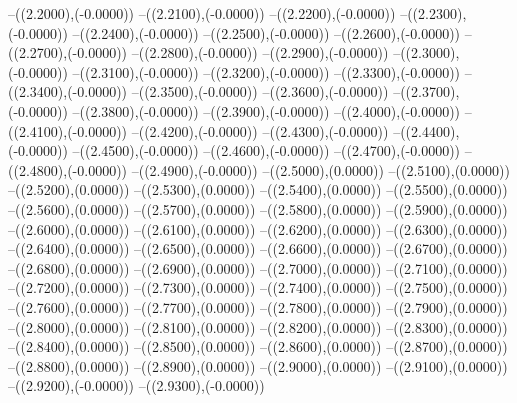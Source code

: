 {	--({\sx*(2.2000)},{\sy*(-0.0000)})
	--({\sx*(2.2100)},{\sy*(-0.0000)})
	--({\sx*(2.2200)},{\sy*(-0.0000)})
	--({\sx*(2.2300)},{\sy*(-0.0000)})
	--({\sx*(2.2400)},{\sy*(-0.0000)})
	--({\sx*(2.2500)},{\sy*(-0.0000)})
	--({\sx*(2.2600)},{\sy*(-0.0000)})
	--({\sx*(2.2700)},{\sy*(-0.0000)})
	--({\sx*(2.2800)},{\sy*(-0.0000)})
	--({\sx*(2.2900)},{\sy*(-0.0000)})
	--({\sx*(2.3000)},{\sy*(-0.0000)})
	--({\sx*(2.3100)},{\sy*(-0.0000)})
	--({\sx*(2.3200)},{\sy*(-0.0000)})
	--({\sx*(2.3300)},{\sy*(-0.0000)})
	--({\sx*(2.3400)},{\sy*(-0.0000)})
	--({\sx*(2.3500)},{\sy*(-0.0000)})
	--({\sx*(2.3600)},{\sy*(-0.0000)})
	--({\sx*(2.3700)},{\sy*(-0.0000)})
	--({\sx*(2.3800)},{\sy*(-0.0000)})
	--({\sx*(2.3900)},{\sy*(-0.0000)})
	--({\sx*(2.4000)},{\sy*(-0.0000)})
	--({\sx*(2.4100)},{\sy*(-0.0000)})
	--({\sx*(2.4200)},{\sy*(-0.0000)})
	--({\sx*(2.4300)},{\sy*(-0.0000)})
	--({\sx*(2.4400)},{\sy*(-0.0000)})
	--({\sx*(2.4500)},{\sy*(-0.0000)})
	--({\sx*(2.4600)},{\sy*(-0.0000)})
	--({\sx*(2.4700)},{\sy*(-0.0000)})
	--({\sx*(2.4800)},{\sy*(-0.0000)})
	--({\sx*(2.4900)},{\sy*(-0.0000)})
	--({\sx*(2.5000)},{\sy*(0.0000)})
	--({\sx*(2.5100)},{\sy*(0.0000)})
	--({\sx*(2.5200)},{\sy*(0.0000)})
	--({\sx*(2.5300)},{\sy*(0.0000)})
	--({\sx*(2.5400)},{\sy*(0.0000)})
	--({\sx*(2.5500)},{\sy*(0.0000)})
	--({\sx*(2.5600)},{\sy*(0.0000)})
	--({\sx*(2.5700)},{\sy*(0.0000)})
	--({\sx*(2.5800)},{\sy*(0.0000)})
	--({\sx*(2.5900)},{\sy*(0.0000)})
	--({\sx*(2.6000)},{\sy*(0.0000)})
	--({\sx*(2.6100)},{\sy*(0.0000)})
	--({\sx*(2.6200)},{\sy*(0.0000)})
	--({\sx*(2.6300)},{\sy*(0.0000)})
	--({\sx*(2.6400)},{\sy*(0.0000)})
	--({\sx*(2.6500)},{\sy*(0.0000)})
	--({\sx*(2.6600)},{\sy*(0.0000)})
	--({\sx*(2.6700)},{\sy*(0.0000)})
	--({\sx*(2.6800)},{\sy*(0.0000)})
	--({\sx*(2.6900)},{\sy*(0.0000)})
	--({\sx*(2.7000)},{\sy*(0.0000)})
	--({\sx*(2.7100)},{\sy*(0.0000)})
	--({\sx*(2.7200)},{\sy*(0.0000)})
	--({\sx*(2.7300)},{\sy*(0.0000)})
	--({\sx*(2.7400)},{\sy*(0.0000)})
	--({\sx*(2.7500)},{\sy*(0.0000)})
	--({\sx*(2.7600)},{\sy*(0.0000)})
	--({\sx*(2.7700)},{\sy*(0.0000)})
	--({\sx*(2.7800)},{\sy*(0.0000)})
	--({\sx*(2.7900)},{\sy*(0.0000)})
	--({\sx*(2.8000)},{\sy*(0.0000)})
	--({\sx*(2.8100)},{\sy*(0.0000)})
	--({\sx*(2.8200)},{\sy*(0.0000)})
	--({\sx*(2.8300)},{\sy*(0.0000)})
	--({\sx*(2.8400)},{\sy*(0.0000)})
	--({\sx*(2.8500)},{\sy*(0.0000)})
	--({\sx*(2.8600)},{\sy*(0.0000)})
	--({\sx*(2.8700)},{\sy*(0.0000)})
	--({\sx*(2.8800)},{\sy*(0.0000)})
	--({\sx*(2.8900)},{\sy*(0.0000)})
	--({\sx*(2.9000)},{\sy*(0.0000)})
	--({\sx*(2.9100)},{\sy*(0.0000)})
	--({\sx*(2.9200)},{\sy*(-0.0000)})
	--({\sx*(2.9300)},{\sy*(-0.0000)})
}

